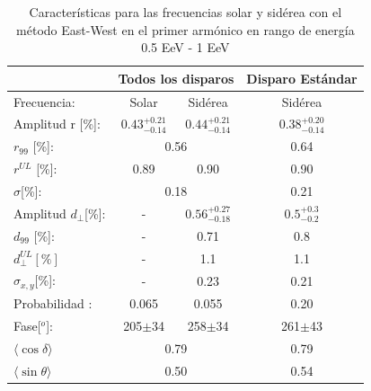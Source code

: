 \begin{table}[H]
        \begin{small}
            \begin{center}
                \begin{tabular}[c]{l|c|c||c|}
\cline{2-4}                                       & \multicolumn{2}{c||}{Todos los disparos}    & \multicolumn{1}{c|}{Disparo Estándar}   \\ \hline
\multicolumn{1}{|l|}{Frecuencia:                } & Solar	                & Sidérea	                & Sidérea \cite{Aab_2020}   \\ \hline
\multicolumn{1}{|l|}{Amplitud r [\%]:           } & $0.43^{+0.21}_{-0.14}$	& $0.44^{+0.21}_{-0.14}$ 	& $0.38^{+0.20}_{-0.14}$ \cite{codigo}      \\
\multicolumn{1}{|l|}{$r_{99}$ [\%]:             } & \multicolumn{2}{c||}{0.56}                          & 0.64\cite{codigo}                 \\
\multicolumn{1}{|l|}{$r^{UL}$ [\%]:             } & 0.89 	                & 0.90                      & 0.90 \cite{codigo}                 \\ 
\multicolumn{1}{|l|}{$\sigma$[\%]:              } & \multicolumn{2}{c||}{0.18}                          & 0.21 \cite{codigo}      \\\hline
\multicolumn{1}{|l|}{Amplitud $d_\perp$[\%]:    } & -	                    & $0.56^{+0.27}_{-0.18}$ 	& $0.5^{+0.3}_{-0.2}$       \\
\multicolumn{1}{|l|}{$d_{99}$ [\%]:             } & - 	                    & 0.71                      & 0.8   \cite{codigo}                \\
\multicolumn{1}{|l|}{$d_{\perp}^{UL}[\%]$       } & -                       & 1.1                       & 1.1                         \\
\multicolumn{1}{|l|}{$\sigma_{x,y}$[\%]:        } & -	                    & 0.23	                    & 0.21       \\\hline
\multicolumn{1}{|l|}{Probabilidad      :        } & 0.065                   & 0.055	                    & 0.20       \\
\multicolumn{1}{|l|}{Fase[$^o$]:                } & 205$\pm$34              & 258$\pm$34                & 261$\pm$43\\ \hline
\multicolumn{1}{|l|}{$\langle\cos\delta \rangle$} & \multicolumn{2}{c||}{0.79}        	                & 0.79 \cite{codigo}        \\        
\multicolumn{1}{|l|}{$\langle\sin\theta \rangle$} & \multicolumn{2}{c||}{0.50}        	                & 0.54\cite{codigo}        \\ \hline       
                \end{tabular}
            \end{center}
        \end{small}
        \caption{Características para las frecuencias solar y sidérea con el método East-West en el primer armónico en rango de energía 0.5 EeV - 1 EeV}
        \label{tab:segundo_bin_data}
    \end{table}



